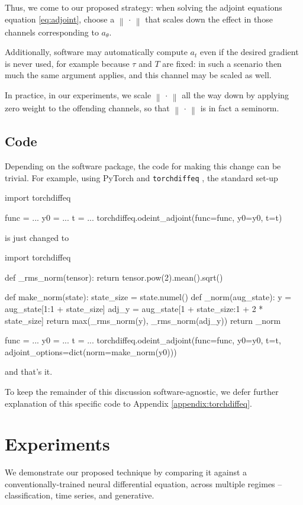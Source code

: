 \documentclass{article}
\theoremstyle{plain}
\theoremstyle{definition}
\newcommand{\norm}[1]{\left\|#1\right\|}
\begin{document}
Thus, we come to our proposed strategy: when solving the adjoint equations equation \eqref{eq:adjoint}, choose a $\norm{\,\cdot\,}$ that scales down the effect in those channels corresponding to $a_\theta$.

Additionally, software may automatically compute $a_t$ even if the desired gradient is never used, for example because $\tau$ and $T$ are fixed: in such a scenario then much the same argument applies, and this channel may be scaled as well.

In practice, in our experiments, we scale $\norm{\,\cdot\,}$ all the way down by applying zero weight to the offending channels, so that $\norm{\,\cdot\,}$ is in fact a seminorm.

\subsection{Code}
Depending on the software package, the code for making this change can be trivial. For example, using PyTorch and \texttt{torchdiffeq} \citep{neural-odes}, the standard set-up
\begin{python}
import torchdiffeq

func = ...
y0 = ...
t = ...
torchdiffeq.odeint_adjoint(func=func, y0=y0, t=t)
\end{python}
is just changed to
\begin{python}
import torchdiffeq

def _rms_norm(tensor):
    return tensor.pow(2).mean().sqrt()

def make_norm(state):
    state_size = state.numel()
    def _norm(aug_state):
        y = aug_state[1:1 + state_size]
        adj_y = aug_state[1 + state_size:1 + 2 * state_size]
        return max(_rms_norm(y), _rms_norm(adj_y))
    return _norm

func = ...    
y0 = ...
t = ...
torchdiffeq.odeint_adjoint(func=func, y0=y0, t=t, 
                           adjoint_options=dict(norm=make_norm(y0)))
\end{python}
and that's it.

To keep the remainder of this discussion software-agnostic, we defer further explanation of this specific code to Appendix \ref{appendix:torchdiffeq}.

\section{Experiments}

We demonstrate our proposed technique by comparing it against a conventionally-trained neural differential equation, across multiple regimes -- classification, time series, and generative.
\end{document}
